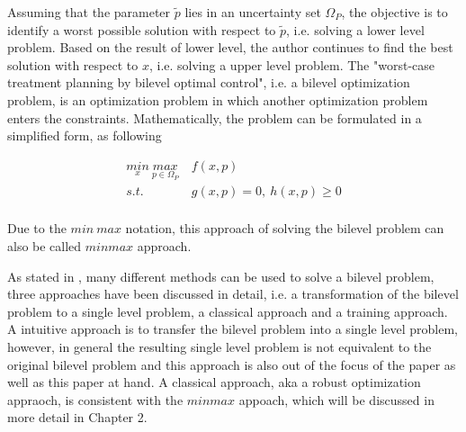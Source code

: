 Assuming that the parameter $\tilde{p}$ lies in an uncertainty set $\Omega_P$, the objective is to identify a worst possible solution with respect to $\tilde{p}$, i.e. solving a lower level problem. Based on the result of lower level, the author continues to find the best solution with respect to $x$, i.e. solving a upper level problem. The "worst-case treatment planning by bilevel optimal control", i.e. a  bilevel optimization problem, is an optimization problem in which another optimization problem enters the constraints. Mathematically, the problem can be formulated in a simplified form, as following




\begin{equation}
	\begin{aligned}
		\underset{x}{min} \   \underset{p \in \Omega_P}{max} & \  f(x,p) \\ 
		s.t.  & \  g(x, p) = 0, \  h(x,p)  \geq  0 \\
	\end{aligned}
\end{equation}


Due to the $min \ max$ notation, this approach of solving the bilevel problem can also be called $min max$ approach. 

As stated in \cite{MatSch22}, many different methods can be used to solve a bilevel problem, three approaches have been discussed in detail, i.e. a transformation of the bilevel problem to a single level problem, a classical approach and a training approach. A intuitive approach is to transfer the bilevel problem into a single level problem, however, in general the resulting single level problem is not equivalent to the original bilevel problem and this approach is also out of the focus of the paper \cite{MatSch22} as well as this paper at hand. A classical approach, aka a robust optimization appraoch, is consistent with the $minmax$ appoach, which will be discussed in more detail in Chapter 2.

